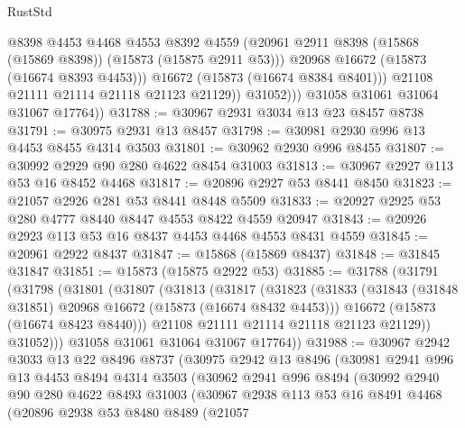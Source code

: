 \begin{lexlean}{RustStd}
\begin{coremodule}
                      @8398
                      @4453
                      @4468
                      @4553
                      @8392
                      @4559
                      (@20961 @2911 @8398 (@15868 (@15869 @8398)) (@15873 (@15875 @2911 @53)))
                      @20968
                      @16672
                      (@15873 (@16674 @8393 @4453)))
                    @16672
                    (@15873 (@16674 @8384 @8401)))
                  @21108
                  @21111
                  @21114
                  @21118
                  @21123
                  @21129))
              @31052)))
        @31058
        @31061
        @31064
        @31067
        @17764))
@31788 := @30967 @2931 @3034 @13 @23 @8457 @8738
@31791 := @30975 @2931 @13 @8457
@31798 := @30981 @2930 @996 @13 @4453 @8455 @4314 @3503
@31801 := @30962 @2930 @996 @8455
@31807 := @30992 @2929 @90 @280 @4622 @8454 @31003
@31813 := @30967 @2927 @113 @53 @16 @8452 @4468
@31817 := @20896 @2927 @53 @8441 @8450
@31823 := @21057 @2926 @281 @53 @8441 @8448 @5509
@31833 := @20927 @2925 @53 @280 @4777 @8440 @8447 @4553 @8422 @4559 @20947
@31843 := @20926 @2923 @113 @53 @16 @8437 @4453 @4468 @4553 @8431 @4559
@31845 := @20961 @2922 @8437
@31847 := @15868 (@15869 @8437)
@31848 := @31845 @31847
@31851 := @15873 (@15875 @2922 @53)
@31885 := @31788
    (@31791
      (@31798
        (@31801
          (@31807
            (@31813
              (@31817
                (@31823
                  (@31833
                    (@31843 (@31848 @31851) @20968 @16672 (@15873 (@16674 @8432 @4453)))
                    @16672
                    (@15873 (@16674 @8423 @8440)))
                  @21108
                  @21111
                  @21114
                  @21118
                  @21123
                  @21129))
              @31052)))
        @31058
        @31061
        @31064
        @31067
        @17764))
@31988 := @30967
    @2942
    @3033
    @13
    @22
    @8496
    @8737
    (@30975
      @2942
      @13
      @8496
      (@30981
        @2941
        @996
        @13
        @4453
        @8494
        @4314
        @3503
        (@30962
          @2941
          @996
          @8494
          (@30992
            @2940
            @90
            @280
            @4622
            @8493
            @31003
            (@30967
              @2938
              @113
              @53
              @16
              @8491
              @4468
              (@20896
                @2938
                @53
                @8480
                @8489
                (@21057

\end{coremodule}
\end{lexlean}
